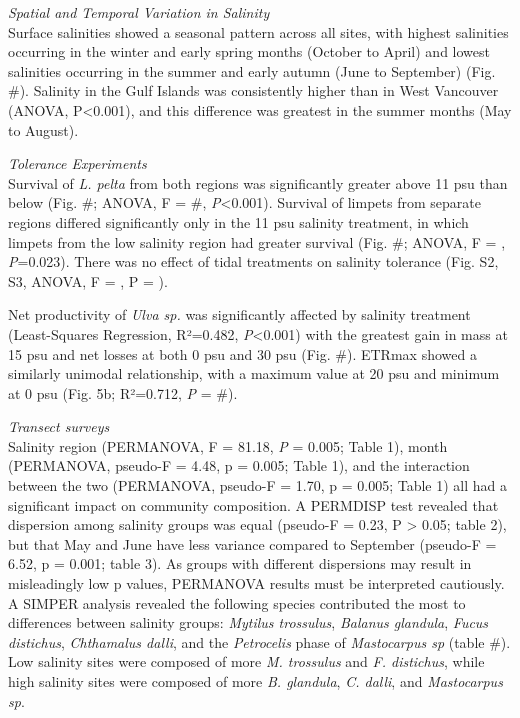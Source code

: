 \documentclass[
  11pt,
]{article}
\begin{document}
\emph{Spatial and Temporal Variation in Salinity}\\
Surface salinities showed a seasonal pattern across all sites, with highest salinities occurring in the winter and early spring months (October to April) and lowest salinities occurring in the summer and early autumn (June to September) (Fig. \#). Salinity in the Gulf Islands was consistently higher than in West Vancouver (ANOVA, P\textless0.001), and this difference was greatest in the summer months (May to August).

\emph{Tolerance Experiments}\\
Survival of \emph{L. pelta} from both regions was significantly greater above 11 psu than below (Fig. \#; ANOVA, F = \#, \emph{P}\textless0.001). Survival of limpets from separate regions differed significantly only in the 11 psu salinity treatment, in which limpets from the low salinity region had greater survival (Fig. \#; ANOVA, F = , \emph{P}=0.023). There was no effect of tidal treatments on salinity tolerance (Fig. S2, S3, ANOVA, F = , P = ).

Net productivity of \emph{Ulva sp.} was significantly affected by salinity treatment (Least-Squares Regression, R²=0.482, \emph{P}\textless0.001) with the greatest gain in mass at 15 psu and net losses at both 0 psu and 30 psu (Fig. \#). ETRmax showed a similarly unimodal relationship, with a maximum value at 20 psu and minimum at 0 psu (Fig. 5b; R²=0.712, \emph{P} = \#).

\emph{Transect surveys}\\
Salinity region (PERMANOVA, F = 81.18, \emph{P} = 0.005; Table 1), month (PERMANOVA, pseudo-F = 4.48, p = 0.005; Table 1), and the interaction between the two (PERMANOVA, pseudo-F = 1.70, p = 0.005; Table 1) all had a significant impact on community composition. A PERMDISP test revealed that dispersion among salinity groups was equal (pseudo-F = 0.23, P \textgreater{} 0.05; table 2), but that May and June have less variance compared to September (pseudo-F = 6.52, p = 0.001; table 3). As groups with different dispersions may result in misleadingly low p values, PERMANOVA results must be interpreted cautiously. A SIMPER analysis revealed the following species contributed the most to differences between salinity groups: \emph{Mytilus trossulus}, \emph{Balanus glandula}, \emph{Fucus distichus}, \emph{Chthamalus dalli}, and the \emph{Petrocelis} phase of \emph{Mastocarpus sp} (table \#). Low salinity sites were composed of more \emph{M. trossulus} and \emph{F. distichus}, while high salinity sites were composed of more \emph{B. glandula}, \emph{C. dalli}, and \emph{Mastocarpus sp}.
\end{document}
